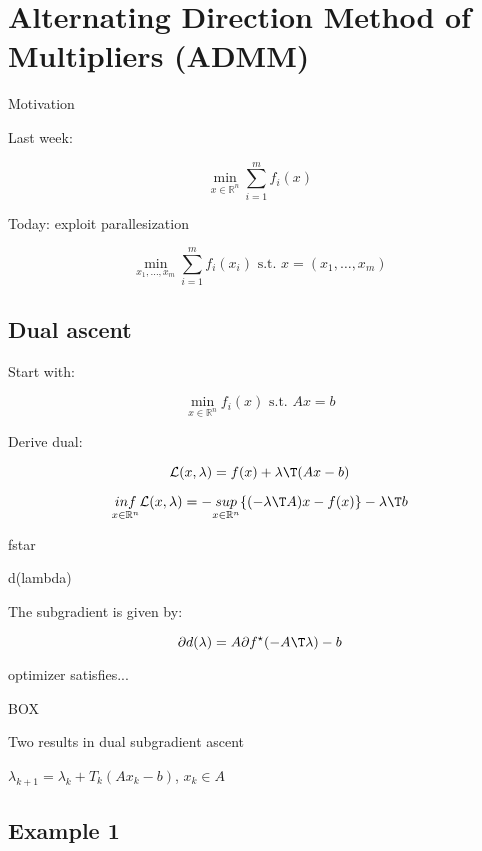 \section{Alternating Direction Method of Multipliers (ADMM)}

Motivation

Last week:

\begin{equation}
	\min_{x \in \mathbb{R}^{n}} \sum_{i = 1}^{m} f_i(x)
	\label{eq:sum_f_i}
\end{equation}

Today: exploit parallesization

\begin{equation}
	\min_{x_1,\dots,x_m} \sum_{i = 1}^{m} f_i(x_i)\text{ s.t. }x = (x_1,\dots,x_m)
\end{equation}

\subsection{Dual ascent}

Start with:

\begin{equation}
	\min_{x \in \mathbb{R}^{n}} f_i(x) \text{ s.t. } Ax=b
\end{equation}

Derive dual:

$$\mathcal{L}(x,\lambda) = f(x) + \lambda\T (Ax-b)$$

$$\underset{x \in \mathcal{\mathbb{R}}^n}{inf}\mathcal{L}(x,\lambda) =
	-\underset{x \in \mathcal{\mathbb{R}}^n}{sup}\{(-\lambda\T A)x-f(x)\}-\lambda\T b$$


fstar

d(lambda)

The subgradient is given by:

$$ \partial d(\lambda)= A\partial f^\star(-A\T\lambda) -b $$

optimizer satisfies...


BOX

Two results in dual subgradient ascent

$\lambda_{k+1}=\lambda_k+T_k(Ax_k-b)$, $x_k \in A$

\subsection{Example 1}

